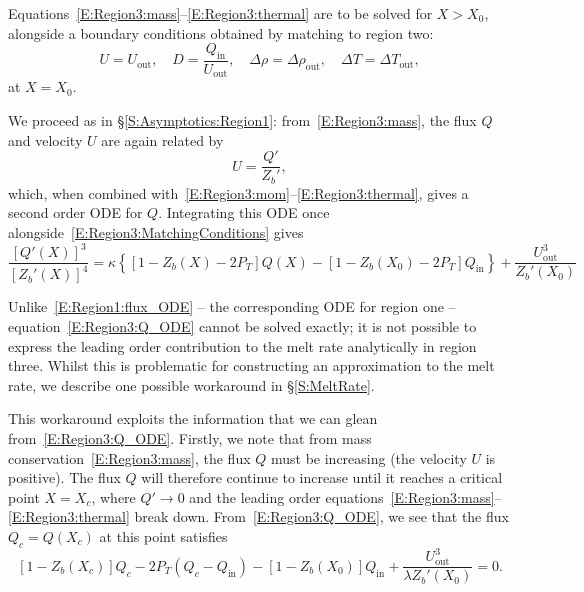 \documentclass[openacc]{rsproca_new}%
\newcommand{\Pt}{\textit{P}_T}
\renewcommand{\in}{\text{in}} %
\newcommand{\out}{\text{out}}
\begin{document}
Equations~\eqref{E:Region3:mass}--\eqref{E:Region3:thermal} are to be solved for $X > X_0$, alongside a boundary conditions obtained by matching to region two:
\begin{equation}\label{E:Region3:MatchingConditions}
U = U_\out, \quad D = \frac{Q_\in}{U_\out}, \quad \Delta \rho = \Delta \rho_\out, \quad \Delta T = \Delta T_\out,
\end{equation}
at $X = X_0$. 

We proceed as in \S\ref{S:Asymptotics:Region1}: from~\eqref{E:Region3:mass}, the flux $Q$ and velocity $U$ are again related by
\begin{equation}\label{E:Region3:U_Q_relation}
U = \frac{Q'}{Z_b'},
\end{equation}
which, when combined with~\eqref{E:Region3:mom}--\eqref{E:Region3:thermal}, gives a second order ODE for $Q$. Integrating this ODE once alongside~\eqref{E:Region3:MatchingConditions} gives
\begin{equation}\label{E:Region3:Q_ODE}
\frac{\left[Q'(X)\right]^3}{\left[Z_b'(X)\right]^4} = \kappa \left\{ \left[1 - Z_b(X) - 2P_T\right] Q(X) - \left[1 - Z_b(X_0) - 2P_T\right]Q_\text{in}\right\} + \frac{U_\text{out}^3}{Z_b'(X_0)}
\end{equation}

Unlike~\eqref{E:Region1:flux_ODE} -- the corresponding ODE for region one -- equation~\eqref{E:Region3:Q_ODE} cannot be solved exactly; it is not possible to express the leading order contribution to the melt rate analytically in region three. Whilst this is problematic for constructing an approximation to the melt rate, we describe one possible workaround in \S\ref{S:MeltRate}. 

This workaround exploits the information that we can glean from~\eqref{E:Region3:Q_ODE}. Firstly, we note that from mass conservation~\eqref{E:Region3:mass}, the flux $Q$ must be increasing (the velocity $U$ is positive). The flux $Q$ will therefore continue to increase until it reaches a critical point $X = X_c$, where $Q' \to 0$ and the leading order equations~\eqref{E:Region3:mass}--\eqref{E:Region3:thermal} break down. From~\eqref{E:Region3:Q_ODE}, we see that the flux $Q_c =Q(X_c)$ at this point satisfies 
\begin{equation}
\left[1 - Z_b(X_c)\right]Q_c - 2\Pt\left(Q_c - Q_\in\right) -\left[1 - Z_b(X_0)\right]Q_\in +  \frac{U_\out^3}{\lambda Z_b'(X_0)} = 0.
\end{equation}
\end{document}
